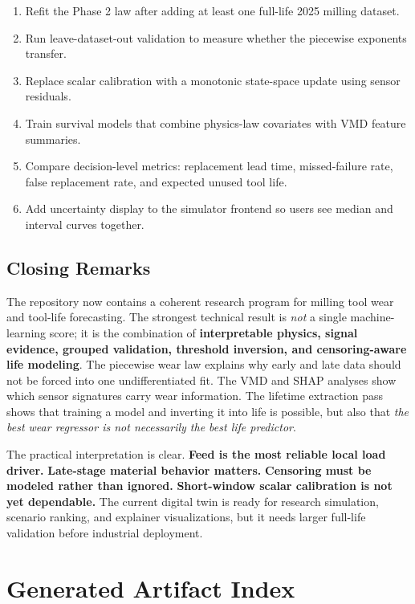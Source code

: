 \documentclass[11pt,a4paper]{article}
\begin{document}
\begin{enumerate}
  \item Refit the Phase 2 law after adding at least one full-life 2025 milling dataset.
  \item Run leave-dataset-out validation to measure whether the piecewise exponents transfer.
  \item Replace scalar calibration with a monotonic state-space update using sensor residuals.
  \item Train survival models that combine physics-law covariates with VMD feature summaries.
  \item Compare decision-level metrics: replacement lead time, missed-failure rate, false replacement rate, and expected unused tool life.
  \item Add uncertainty display to the simulator frontend so users see median and interval curves together.
\end{enumerate}

\subsection{Closing Remarks}

The repository now contains a coherent research program for milling tool wear and tool-life forecasting. The strongest technical result is \emph{not} a single machine-learning score; it is the combination of \textbf{interpretable physics, signal evidence, grouped validation, threshold inversion, and censoring-aware life modeling}. The piecewise wear law explains why early and late data should not be forced into one undifferentiated fit. The VMD and SHAP analyses show which sensor signatures carry wear information. The lifetime extraction pass shows that training a model and inverting it into life is possible, but also that \emph{the best wear regressor is not necessarily the best life predictor}.

The practical interpretation is clear. \textbf{Feed is the most reliable local load driver.} \textbf{Late-stage material behavior matters.} \textbf{Censoring must be modeled rather than ignored.} \textbf{Short-window scalar calibration is not yet dependable.} The current digital twin is ready for research simulation, scenario ranking, and explainer visualizations, but it needs larger full-life validation before industrial deployment.

\appendix

\section{Generated Artifact Index}
\end{document}
